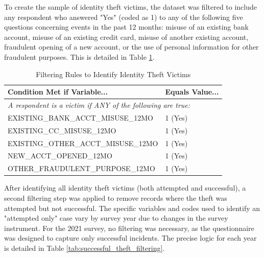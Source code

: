 
To create the sample of identity theft victims, the dataset was filtered to include any respondent who answered "Yes" (coded as 1) to any of the following five questions concerning events in the past 12 months: misuse of an existing bank account, misuse of an existing credit card, misuse of another existing account, fraudulent opening of a new account, or the use of personal information for other fraudulent purposes. This is detailed in Table \ref{tab:victim_filtering}.

\begin{table}[ht]
\centering
\caption{Filtering Rules to Identify Identity Theft Victims}
\label{tab:victim_filtering}
\begin{tabular}{p{}l}
\toprule
\textbf{Condition Met if Variable...} & \textbf{Equals Value...} \\
\midrule
\multicolumn{2}{l}{\textit{A respondent is a victim if ANY of the following are true:}} \\
\addlinespace %
EXISTING\_BANK\_ACCT\_MISUSE\_12MO   & 1 (Yes) \\
EXISTING\_CC\_MISUSE\_12MO         & 1 (Yes) \\
EXISTING\_OTHER\_ACCT\_MISUSE\_12MO  & 1 (Yes) \\
NEW\_ACCT\_OPENED\_12MO            & 1 (Yes) \\
OTHER\_FRAUDULENT\_PURPOSE\_12MO   & 1 (Yes) \\
\bottomrule
\end{tabular}
\end{table}

After identifying all identity theft victims (both attempted and successful), a second filtering step was applied to remove records where the theft was attempted but not successful. The specific variables and codes used to identify an "attempted only" case vary by survey year due to changes in the survey instrument. For the 2021 survey, no filtering was necessary, as the questionnaire was designed to capture only successful incidents. The precise logic for each year is detailed in Table \ref{tab:successful_theft_filtering}.

